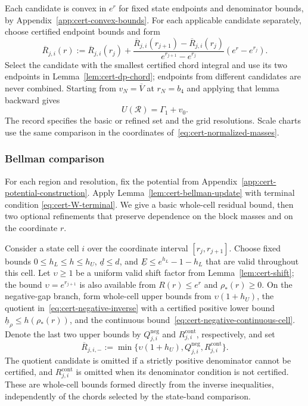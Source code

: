 \documentclass[11pt]{article}
\theoremstyle{definition}
\theoremstyle{remark}
\begin{document}
Each candidate is convex in $e^r$ for fixed state endpoints and
denominator bounds, by Appendix~\ref{app:cert-convex-bounds}.
For each applicable candidate separately, choose certified endpoint
bounds and form
\begin{equation}\label{eq:cert-scheme-II-R-chord}
 \overline R_{j,i}(r)
 :=\overline R_{j,i}(r_j)
 +\frac{\overline R_{j,i}(r_{j+1})-\overline R_{j,i}(r_j)}
 {e^{r_{j+1}}-e^{r_j}}(e^r-e^{r_j}).
\end{equation}
Select the candidate with the smallest certified chord integral and
use its two endpoints in Lemma~\ref{lem:cert-dp-chord}; endpoints from
different candidates are never combined.
Starting from $v_N=\overline V$ at $r_N=b_4$ and applying that lemma backward gives
\begin{equation}\label{eq:cert-state-band-upper}
 U(\mathcal R)=\Gamma_1+v_0.
\end{equation}
The record specifies the basic or refined set and the grid resolutions.
Scale charts use the same comparison in the coordinates
of~\eqref{eq:cert-normalized-masses}.

\subsubsection{Bellman comparison}

For each region and resolution, fix the potential from
Appendix~\ref{app:cert-potential-construction}.
Apply Lemma~\ref{lem:cert-bellman-update} with terminal condition
\eqref{eq:cert-W-terminal}.  We give a basic whole-cell residual bound,
then two optional refinements that preserve dependence on the block
masses and on the coordinate $r$.

Consider a state cell $i$ over the coordinate interval $[r_j,r_{j+1}]$.
Choose fixed bounds $0\le h_L\le h\le h_U$, $\underline d\le d$,
and $\underline E\le e^{h_L}-1-h_L$ that are valid throughout this cell.
Let $\upsilon\ge1$ be a uniform valid shift factor from
Lemma~\ref{lem:cert-shift}; the bound $\upsilon=e^{r_{j+1}}$ is also
available from $R(r)\le e^r$ and $\rho_*(r)\ge0$.
On the negative-gap branch, form whole-cell upper bounds from
$\upsilon(1+h_U)$, the quotient in~\eqref{eq:cert-negative-inverse}
with a certified positive lower bound $\underline h_\rho\le h(\rho_*(r))$,
and the continuous bound~\eqref{eq:cert-negative-continuous-cell}.
Denote the last two upper bounds by $Q_{j,i}^{\mathrm{neg}}$ and $R_{j,i}^{\mathrm{cont}}$, respectively,
and set
\begin{equation}\label{eq:cert-scheme-IV-negative}
 \overline R_{j,i,-}
 :=\min\{\upsilon(1+h_U),Q_{j,i}^{\mathrm{neg}},R_{j,i}^{\mathrm{cont}}\}.
\end{equation}
The quotient candidate is omitted if a strictly positive denominator
cannot be certified, and $R_{j,i}^{\mathrm{cont}}$ is omitted when its denominator
condition is not certified.  These are whole-cell bounds formed
directly from the inverse inequalities, independently of the chords selected by the state-band comparison.
\end{document}
